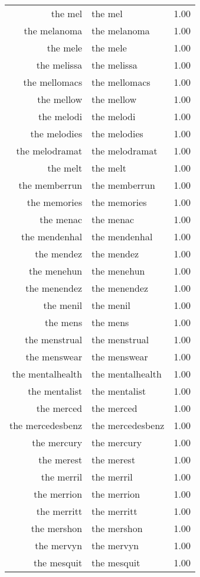 \begin{table}[ht]
\begin{tabular}{rlr}
  the mel & the mel & 1.00 \\ 
  the melanoma & the melanoma & 1.00 \\ 
  the mele & the mele & 1.00 \\ 
  the melissa & the melissa & 1.00 \\ 
  the mellomacs & the mellomacs & 1.00 \\ 
  the mellow & the mellow & 1.00 \\ 
  the melodi & the melodi & 1.00 \\ 
  the melodies & the melodies & 1.00 \\ 
  the melodramat & the melodramat & 1.00 \\ 
  the melt & the melt & 1.00 \\ 
  the memberrun & the memberrun & 1.00 \\ 
  the memories & the memories & 1.00 \\ 
  the menac & the menac & 1.00 \\ 
  the mendenhal & the mendenhal & 1.00 \\ 
  the mendez & the mendez & 1.00 \\ 
  the menehun & the menehun & 1.00 \\ 
  the menendez & the menendez & 1.00 \\ 
  the menil & the menil & 1.00 \\ 
  the mens & the mens & 1.00 \\ 
  the menstrual & the menstrual & 1.00 \\ 
  the menswear & the menswear & 1.00 \\ 
  the mentalhealth & the mentalhealth & 1.00 \\ 
  the mentalist & the mentalist & 1.00 \\ 
  the merced & the merced & 1.00 \\ 
  the mercedesbenz & the mercedesbenz & 1.00 \\ 
  the mercury & the mercury & 1.00 \\ 
  the merest & the merest & 1.00 \\ 
  the merril & the merril & 1.00 \\ 
  the merrion & the merrion & 1.00 \\ 
  the merritt & the merritt & 1.00 \\ 
  the mershon & the mershon & 1.00 \\ 
  the mervyn & the mervyn & 1.00 \\ 
  the mesquit & the mesquit & 1.00 \\ 

\end{tabular}
\end{table}
